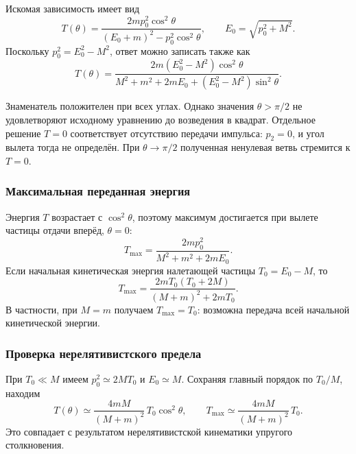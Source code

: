 \documentclass[../final.tex]{subfiles}
\begin{document}
Искомая зависимость имеет вид
%
\begin{equation*}
    \boxed{
        T(\theta)=
        \frac{2mp_0^2\cos^2\theta}
        {(E_0+m)^2-p_0^2\cos^2\theta}
    },
    \qquad E_0=\sqrt{p_0^2+M^2}.
\end{equation*}
%
Поскольку $p_0^2=E_0^2-M^2$, ответ можно записать также как
%
\begin{equation*}
    \boxed{
        T(\theta)=
        \frac{2m(E_0^2-M^2)\cos^2\theta}
        {M^2+m^2+2mE_0+(E_0^2-M^2)\sin^2\theta}
    }.
\end{equation*}

Знаменатель положителен при всех углах.
Однако значения $\theta>\pi/2$ не удовлетворяют исходному
уравнению до возведения в квадрат.
Отдельное решение $T=0$ соответствует отсутствию передачи импульса:
$p_2=0$, и угол вылета тогда не определён.
При $\theta\to\pi/2$ полученная ненулевая ветвь стремится к $T=0$.

\subsubsection*{Максимальная переданная энергия}

Энергия $T$ возрастает с $\cos^2\theta$, поэтому максимум
достигается при вылете частицы отдачи вперёд, $\theta=0$:
%
\begin{equation*}
    \boxed{
        T_{\max}=
        \frac{2mp_0^2}{M^2+m^2+2mE_0}
    }.
\end{equation*}
%
Если начальная кинетическая энергия налетающей частицы
$T_0=E_0-M$, то
%
\begin{equation*}
    T_{\max}=
    \frac{2mT_0(T_0+2M)}{(M+m)^2+2mT_0}.
\end{equation*}
%
В частности, при $M=m$ получаем $T_{\max}=T_0$:
возможна передача всей начальной кинетической энергии.

\subsubsection*{Проверка нерелятивистского предела}

При $T_0\ll M$ имеем $p_0^2\simeq2MT_0$ и $E_0\simeq M$.
Сохраняя главный порядок по $T_0/M$, находим
%
\begin{equation*}
    T(\theta)\simeq
    \frac{4mM}{(M+m)^2}\,T_0\cos^2\theta,
    \qquad
    T_{\max}\simeq\frac{4mM}{(M+m)^2}\,T_0.
\end{equation*}
%
Это совпадает с результатом нерелятивистской кинематики
упругого столкновения.
\end{document}
